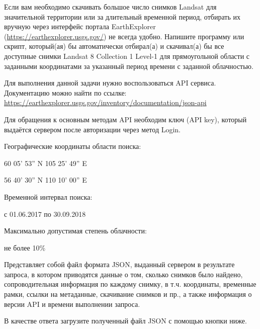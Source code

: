 
Если вам необходимо скачивать большое число снимков Landsat для значительной территории или за 
длительный временной период, отбирать их вручную через интерфейс портала EarthExplorer (\url{https://earthexplorer.usgs.gov/}) не всегда удобно. Напишите программу или скрипт, который(ая) бы автоматически отбирал(а) и скачивал(а) бы все доступные снимки Landsat 8 Collection 1 Level-1 для прямоугольной области с заданными координатами за указанный период времени с заданной облачностью.

Для выполнения данной задачи нужно воспользоваться API сервиса. Документацию можно найти по ссылке:\\
\url{https://earthexplorer.usgs.gov/inventory/documentation/json-api}

Для обращения к основным методам API необходим ключ (API key), который выдаётся сервером после авторизации через метод Login.


Географические координаты области поиска:

60 05’ 53” N 105 25’ 49” E

56 40’ 30” N 110 10’ 00” E

Временной интервал поиска:

с 01.06.2017 по 30.09.2018

Максимально допустимая степень облачности:

не более 10\%

\outputfmtSection

Представляет собой файл формата JSON, выданный сервером в результате запроса, в котором приводятся данные о
том, сколько снимков было найдено, сопроводительная информация по каждому
снимку, в т.ч. координаты, временные рамки, ссылки на метаданные, скачивание
снимков и пр., а также информация о версии API и времени выполнении запроса. 

В качестве ответа загрузите полученный файл JSON с помощью кнопки ниже.